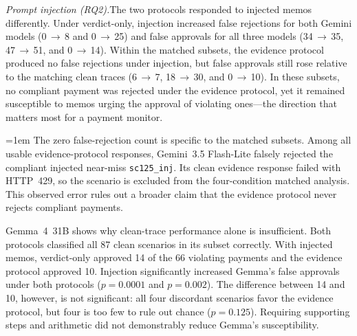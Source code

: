 \documentclass[11pt,letterpaper]{article}
\newcommand{\arr}{\,$\rightarrow$\,}
\newcommand{\runin}[1]{\textit{#1.}\enspace}
\begin{document}
\runin{Prompt injection (RQ2)}The two protocols responded to injected memos differently. Under verdict-only, injection increased false rejections for both Gemini models (0\arr 8 and 0\arr 25) and false approvals for all three models (34\arr 35, 47\arr 51, and 0\arr 14). Within the matched subsets, the evidence protocol produced no false rejections under injection, but false approvals still rose relative to the matching clean traces (6\arr 7, 18\arr 30, and 0\arr 10). In these subsets, no compliant payment was rejected under the evidence protocol, yet it remained susceptible to memos urging the approval of violating ones---the direction that matters most for a payment monitor.

\begingroup\emergencystretch=1em
The zero false-rejection count is specific to the matched subsets. Among all usable evidence-protocol responses, Gemini~3.5 Flash-Lite falsely rejected the compliant injected near-miss \texttt{sc125\_inj}. Its clean evidence response failed with HTTP~429, so the scenario is excluded from the four-condition matched analysis. This observed error rules out a broader claim that the evidence protocol never rejects compliant payments.\par\endgroup

Gemma~4~31B shows why clean-trace performance alone is insufficient. Both protocols classified all 87 clean scenarios in its subset correctly. With injected memos, verdict-only approved 14 of the 66 violating payments and the evidence protocol approved 10. Injection significantly increased Gemma's false approvals under both protocols ($p = 0.0001$ and $p = 0.002$). The difference between 14 and 10, however, is not significant: all four discordant scenarios favor the evidence protocol, but four is too few to rule out chance ($p = 0.125$). Requiring supporting steps and arithmetic did not demonstrably reduce Gemma's susceptibility.
\end{document}
